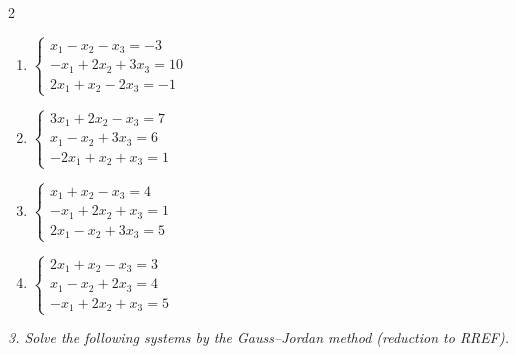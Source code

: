 \begin{multicols}{2}
\begin{enumerate}[label=\arabic*., leftmargin=*]
\item $\begin{cases}x_1-x_2-x_3=-3\\-x_1+2x_2+3x_3=10\\2x_1+x_2-2x_3=-1\end{cases}$

\item $\begin{cases}3x_1+2x_2-x_3=7\\x_1-x_2+3x_3=6\\-2x_1+x_2+x_3=1\end{cases}$

\item $\begin{cases}x_1+x_2-x_3=4\\-x_1+2x_2+x_3=1\\2x_1-x_2+3x_3=5\end{cases}$

\item $\begin{cases}2x_1+x_2-x_3=3\\x_1-x_2+2x_3=4\\-x_1+2x_2+x_3=5\end{cases}$

\end{enumerate}
 \end{multicols}
\emph{3. Solve the following systems by the Gauss–Jordan method (reduction to RREF).}
\bigskip
